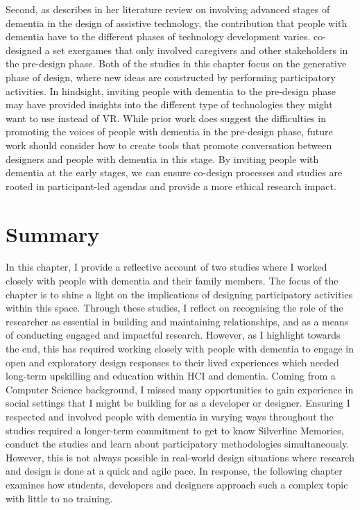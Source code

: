 Second, as \cite{suijkerbuijk_active_2019} describes in her literature review on involving advanced stages of dementia in the design of assistive technology, the contribution that people with dementia have to the different phases of technology development varies. \cite{unbehaun_facilitating_2018} co-designed a set exergames that only involved caregivers and other stakeholders in the pre-design phase. Both of the studies in this chapter focus on the generative phase of design, where new ideas are constructed by performing participatory activities. In hindsight, inviting people with dementia to the pre-design phase may have provided insights into the different type of technologies they might want to use instead of VR. While prior work does suggest the difficulties in promoting the voices of people with dementia in the pre-design phase, future work should consider how to create tools that promote conversation between designers and people with dementia in this stage. By inviting people with dementia at the early stages, we can ensure co-design processes and studies are rooted in participant-led agendas and provide a more ethical research impact.


\section{Summary}
\label{C4:Summary}
In this chapter, I provide a reflective account of two studies where I worked closely with people with dementia and their family members. The focus of the chapter is to shine a light on the implications of designing participatory activities within this space. Through these studies, I reflect on recognising the role of the researcher as essential in building and maintaining relationships, and as a means of conducting engaged and impactful research. However, as I highlight towards the end, this has required working closely with people with dementia to engage in open and exploratory design responses to their lived experiences which needed long-term upskilling and education within HCI and dementia. Coming from a Computer Science background, I missed many opportunities to gain experience in social settings that I might be building for as a developer or designer. Ensuring I respected and involved people with dementia in varying ways throughout the studies required a longer-term commitment to get to know Silverline Memories, conduct the studies and learn about participatory methodologies simultaneously. However, this is not always possible in real-world design situations where research and design is done at a quick and agile pace. In response, the following chapter examines how students, developers and designers approach such a complex topic with little to no training. 

